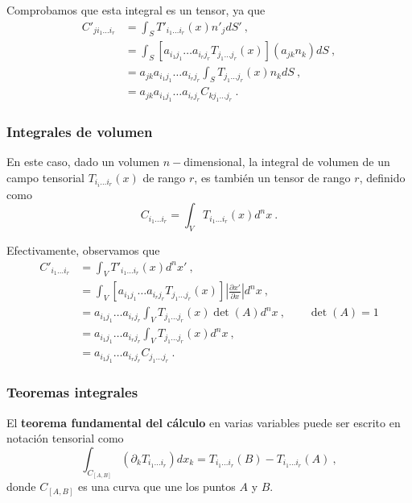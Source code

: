 Comprobamos que esta integral es un tensor, ya que
\begin{align}
    C'_{j i_1 \dots i_r} & = \int_S T'_{i_1 \dots i_r}(x) n'_j dS' \ , \\
    & = \int_S [a_{i_1 j_1} \dots a_{i_r j_r} T_{j_1 \dots j_r}(x)](a_{jk} n_k) dS \ , \\
    & = a_{jk} a_{i_1 j_1} \dots a_{i_r j_r} \int_S T_{j_1 \dots j_r}(x) n_k dS \ , \\
    & = a_{jk} a_{i_1 j_1} \dots a_{i_r j_r} C_{k j_1 \dots j_r} \ .
\end{align}

\subsubsection*{Integrales de volumen}

En este caso, dado un volumen $n-$dimensional, la integral de volumen de un campo tensorial $T_{i_i \dots i_r}(x)$ de rango $r$, es también un tensor de rango $r$, definido como
\begin{equation}
    C_{i_1 \dots i_r} = \int_V T_{i_1 \dots i_r}(x) d^n x \ .
\end{equation}

Efectivamente, observamos que
\begin{align}
    C'_{i_1 \dots i_r} & = \int_V T'_{i_1 \dots i_r}(x) d^n x' \ , \\
    & = \int_V [a_{i_1 j_1} \dots a_{i_r j_r} T_{j_1 \dots j_r}(x)] \left| \frac{\partial x'}{\partial x} \right| d^n x \ , \\
    & = a_{i_1 j_1} \dots a_{i_r j_r} \int_V T_{j_1 \dots j_r}(x) \det(A) d^n x \ , \qquad \det(A) = 1 \\
    & = a_{i_1 j_1} \dots a_{i_r j_r} \int_V T_{j_1 \dots j_r}(x) d^n x \ , \\
    & = a_{i_1 j_1} \dots a_{i_r j_r} C_{j_1 \dots j_r} \ .
\end{align}

\subsubsection*{Teoremas integrales}

El \textbf{teorema fundamental del cálculo} en varias variables puede ser escrito en notación tensorial como
\begin{equation}
    \int_{C_{[A,B]}} (\partial_k T_{i_1 \dots i_r}) dx_k = T_{i_1 \dots i_r}(B) - T_{i_1 \dots i_r}(A) \ ,
\end{equation}
donde $C_{[A,B]}$ es una curva que une los puntos $A$ y $B$.

